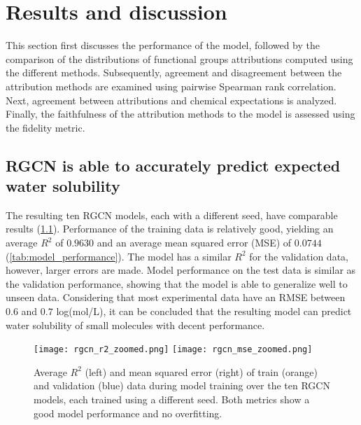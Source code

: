 \chapter{Results and discussion}


This section first discusses the performance of the model, followed by
the comparison of the distributions of functional groups attributions computed 
using the different methods. Subsequently, agreement and disagreement between 
the attribution methods are examined using pairwise Spearman rank correlation. 
Next, agreement between attributions and chemical expectations is analyzed. 
Finally, the faithfulness of the attribution methods to the model is assessed 
using the fidelity metric.

 
\section{RGCN is able to accurately predict expected water solubility}


The resulting ten RGCN models, each with a different seed, have comparable results 
(\cref{fig:training_history}). 
Performance of the training data is relatively good, yielding an average $R^2$ 
of $0.9630$ and an average mean squared error (MSE) of $0.0744$ (\cref{tab:model_performance}). 
The model has a similar $R^2$ for the validation data, however, larger errors are made. 
Model performance on the test data is similar as the validation performance, showing that the 
model is able to generalize well to unseen data. Considering that most experimental data have an RMSE 
between $0.6$ and $0.7$ log(mol/L),\cite{palmer2014experimental} 
it can be concluded that the resulting model can predict water solubility of small 
molecules with decent performance.



\begin{figure}[h]
    \centering
    \texttt{[image: rgcn\_r2\_zoomed.png]}
    \texttt{[image: rgcn\_mse\_zoomed.png]}
    \caption{Average $R^2$ (left) and mean squared error (right) of train (orange) and validation 
    (blue) data during model training over the ten RGCN models, each trained using a different 
    seed. Both metrics show a good model performance and no overfitting. }
    \label{fig:training_history}
\end{figure}


